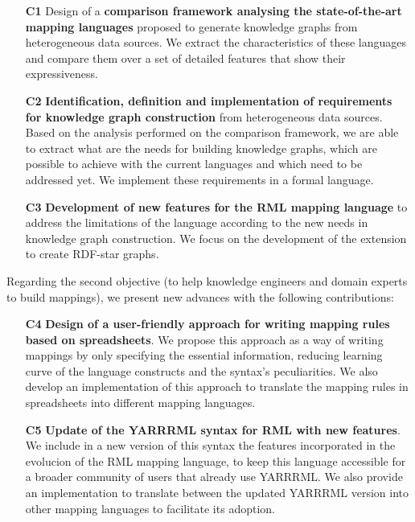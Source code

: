 \begin{enumerate}
    \item[\textbf{C1}] Design of a \textbf{comparison framework analysing the state-of-the-art mapping languages} proposed to generate knowledge graphs from heterogeneous data sources. We extract the characteristics of these languages and compare them over a set of detailed features that show their expressiveness. 
    
    \item[\textbf{C2}] \textbf{Identification, definition and implementation of requirements for knowledge graph construction} from heterogeneous data sources. Based on the analysis performed on the comparison framework, we are able to extract what are the needs for building knowledge graphs, which are possible to achieve with the current languages and which need to be addressed yet. We implement these requirements in a formal language. 
    
    \item[\textbf{C3}] \textbf{Development of new features for the RML mapping language} to address the limitations of the language according to the new needs in knowledge graph construction. We focus on the development of the extension to create RDF-star graphs. 
\end{enumerate}

Regarding the second objective (to help knowledge engineers and domain experts to build mappings), we present new advances with the following contributions:

\begin{enumerate}
    \item[\textbf{C4}] \textbf{Design of a user-friendly approach for writing mapping rules based on spreadsheets}. We propose this approach as a way of writing mappings by only specifying the essential information, reducing learning curve of the language constructs and the syntax's peculiarities. We also develop an implementation of this approach to translate the mapping rules in spreadsheets into different mapping languages. 
    \item[\textbf{C5}] \textbf{Update of the YARRRML syntax for RML with new features}. We include in a new version of this syntax the features incorporated in the evolucion of the RML mapping language, to keep this language accessible for a broader community of users that already use YARRRML. We also provide an implementation to translate between the updated YARRRML version into other mapping languages to facilitate its adoption.
\end{enumerate}

